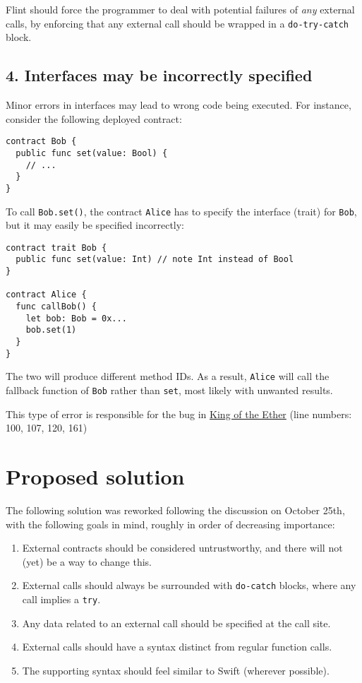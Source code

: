 Flint should force the programmer to deal with potential failures of \textit{any} external calls, by enforcing that any external call should be wrapped in a \texttt{do-try-catch} block.

\subsection{4. Interfaces may be incorrectly specified}

Minor errors in interfaces may lead to wrong code being executed. For instance, consider the following deployed contract:

\begin{verbatim}
contract Bob {
  public func set(value: Bool) {
    // ...
  }
}
\end{verbatim}

To call \texttt{Bob.set()}, the contract \texttt{Alice} has to specify the interface (trait) for \texttt{Bob}, but it may easily be specified incorrectly:

\begin{verbatim}
contract trait Bob {
  public func set(value: Int) // note Int instead of Bool
}

contract Alice {
  func callBob() {
    let bob: Bob = 0x...
    bob.set(1)
  }
}
\end{verbatim}

The two will produce different method IDs. As a result, \texttt{Alice} will call the fallback function of \texttt{Bob} rather than \texttt{set}, most likely with unwanted results.

This type of error is responsible for the bug in \href{https://www.kingoftheether.com/postmortem.html}{King of the Ether} (line numbers: 100, 107, 120, 161)

\section{Proposed solution}

The following solution was reworked following the discussion on October 25th, with the following goals in mind, roughly in order of decreasing importance:

\begin{enumerate}
	\item External contracts should be considered untrustworthy, and there will not (yet) be a way to change this.
	\item External calls should always be surrounded with \texttt{do-catch} blocks, where any call implies a \texttt{try}.
	\item Any data related to an external call should be specified at the call site.
	\item External calls should have a syntax distinct from regular function calls.
	\item The supporting syntax should feel similar to Swift (wherever possible).
\end{enumerate}

